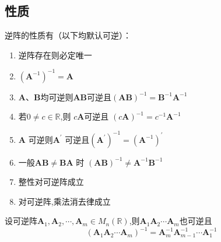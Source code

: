 \subsection{性质}
\begin{formal}
\begin{proposition}[逆阵的性质]\label{prop:逆阵的性质}
    逆阵的性质有（以下均默认可逆）：
\begin{enumerate}[label=\textup{(\arabic*)}]
    \item 逆阵存在则必定唯一
    \item $\left(
        \bm{A}^{-1}
        \right)^{-1} = \bm{A}$
    \item $\bm{A}$、$
    \bm{B}$均可逆则$
    \bm{AB}$可逆且$
    \left(\bm{AB}\right)^{-1} = 
    \bm{B}^{-1}\bm{A}^{-1}$
    \item 若$0\neq c \in \mathbb{R}
    $,则
     $c\bm{A}$可逆且
     $\left(c\bm{A}\right)^{-1}=
     c^{-1}\bm{A}^{-1}$
    \item $\bm{A}$
    可逆则$\bm{A}^{\prime}$
    可逆且$
    \left(\bm{A}^{\prime}\right)^{-1} 
    = \left(
    \bm{A}^{-1}
    \right)^{\prime}$
    \item 一般$
    \bm{AB}\neq\bm{BA}$
        时
    $\left(
        \bm{AB}\right)^{-1}
    \neq\bm{A}^{-1}
    \bm{B}^{-1}$
    \item 整性对可逆阵成立
    \item 对可逆阵,乘法消去律成立
\end{enumerate}
\end{proposition}
\end{formal}
\vfill

\begin{green}
\begin{corollary}[逆阵的积]\label{cor:逆阵的积}
    设可逆阵$\bm{A}_1,\bm{A}_2,\cdots,\bm{A}_m\in M_n\left(\mathbb{R}\right)$,则$\bm{A}_1\bm{A}_2\cdots\bm{A}_m$也可逆且\[
    \left(
        \bm{A}_1\bm{A}_2\cdots\bm{A}_m  
    \right)^{-1}= \bm{A}_m^{-1}\bm{A}_{m-1}^{-1}\cdots\bm{A}_1^{-1}
    \]
\end{corollary}
\end{green}
